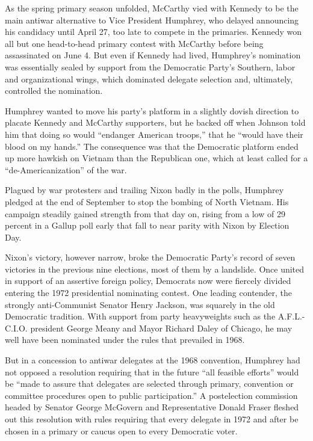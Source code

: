 As the spring primary season unfolded, McCarthy vied with Kennedy to be
the main antiwar alternative to Vice President Humphrey, who delayed
announcing his candidacy until April 27, too late to compete in the
primaries. Kennedy won all but one head-to-head primary contest with
McCarthy before being assassinated on June 4. But even if Kennedy had
lived, Humphrey's nomination was essentially sealed by support from the
Democratic Party's Southern, labor and organizational wings, which
dominated delegate selection and, ultimately, controlled the nomination.

Humphrey wanted to move his party's platform in a slightly dovish
direction to placate Kennedy and McCarthy supporters, but he backed off
when Johnson told him that doing so would ``endanger American troops,''
that he ``would have their blood on my hands.'' The consequence was that
the Democratic platform ended up more hawkish on Vietnam than the
Republican one, which at least called for a ``de-Americanization'' of
the war.

Plagued by war protesters and trailing Nixon badly in the polls,
Humphrey pledged at the end of September to stop the bombing of North
Vietnam. His campaign steadily gained strength from that day on, rising
from a low of 29 percent in a Gallup poll early that fall to near parity
with Nixon by Election Day.

Nixon's victory, however narrow, broke the Democratic Party's record of
seven victories in the previous nine elections, most of them by a
landslide. Once united in support of an assertive foreign policy,
Democrats now were fiercely divided entering the 1972 presidential
nominating contest. One leading contender, the strongly anti-Communist
Senator Henry Jackson, was squarely in the old Democratic tradition.
With support from party heavyweights such as the A.F.L.-C.I.O. president
George Meany and Mayor Richard Daley of Chicago, he may well have been
nominated under the rules that prevailed in 1968.

But in a concession to antiwar delegates at the 1968 convention,
Humphrey had not opposed a resolution requiring that in the future ``all
feasible efforts'' would be ``made to assure that delegates are selected
through primary, convention or committee procedures open to public
participation.'' A postelection commission headed by Senator George
McGovern and Representative Donald Fraser fleshed out this resolution
with rules requiring that every delegate in 1972 and after be chosen in
a primary or caucus open to every Democratic voter.


